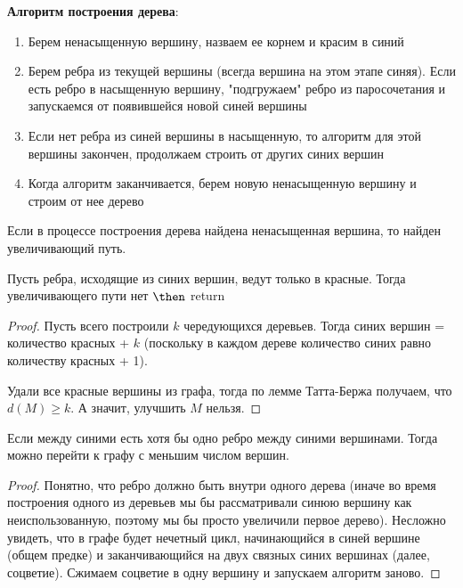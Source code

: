 \textbf{Алгоритм построения дерева}:
\begin{enumerate}
  \item Берем ненасыщенную вершину, назваем ее корнем и красим в синий
  \item Берем ребра из текущей вершины (всегда вершина на этом этапе синяя). Если есть ребро в насыщенную вершину, "подгружаем" ребро из паросочетания и запускаемся от появившейся новой синей вершины
  \item Если нет ребра из синей вершины в насыщенную, то алгоритм для этой вершины закончен, продолжаем строить от других синих вершин
  \item Когда алгоритм заканчивается, берем новую ненасыщенную вершину и строим от нее дерево
\end{enumerate}
\begin{proposition}
  Если в процессе построения дерева найдена ненасыщенная вершина, то найден увеличивающий путь.
\end{proposition}

\begin{proposition}
  Пусть ребра, исходящие из синих вершин, ведут только в красные. Тогда увеличивающего пути нет $\then$ return
\end{proposition}

\begin{proof}
  Пусть всего построили $k$ чередующихся деревьев. Тогда синих вершин = количество красных + $k$ (поскольку в каждом дереве количество синих равно количеству красных + 1).

  Удали все красные вершины из графа, тогда по лемме Татта-Бержа получаем, что $d(M) \ge k$. А значит, улучшить $M$ нельзя.
\end{proof}

\begin{proposition}
  Если между синими есть хотя бы одно ребро между синими вершинами. Тогда можно перейти к графу с меньшим числом вершин.
\end{proposition}

\begin{proof}
Понятно, что ребро должно быть внутри одного дерева (иначе во время построения одного из деревьев мы бы рассматривали синюю вершину как неиспользованную, поэтому мы бы просто увеличили первое дерево). Несложно увидеть, что в графе будет нечетный цикл, начинающийся в синей вершине (общем предке) и заканчивающийся на двух связных синих вершинах (далее, соцветие). Сжимаем соцветие в одну вершину и запускаем алгоритм заново.
\end{proof}

